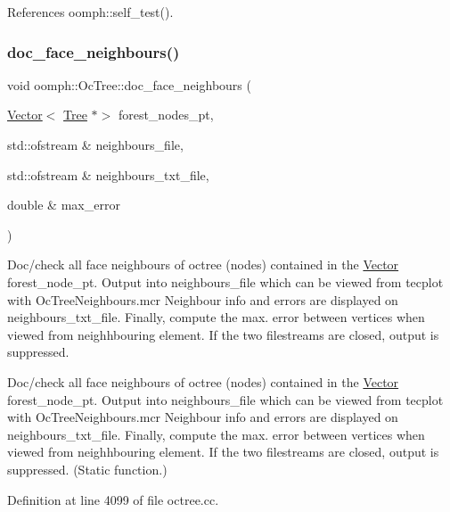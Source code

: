 References oomph\+::self\+\_\+test().

\mbox{\label{classoomph_1_1OcTree_a559d4608359c24b0cd08a25e6990f5a1}} 
\subsubsection{\texorpdfstring{doc\+\_\+face\+\_\+neighbours()}{doc\_face\_neighbours()}}
{\footnotesize\ttfamily void oomph\+::\+Oc\+Tree\+::doc\+\_\+face\+\_\+neighbours (\begin{DoxyParamCaption}\item[{\hyperlink{classoomph_1_1Vector}{Vector}$<$ \hyperlink{classoomph_1_1Tree}{Tree} $\ast$$>$}]{forest\+\_\+nodes\+\_\+pt,  }\item[{std\+::ofstream \&}]{neighbours\+\_\+file,  }\item[{std\+::ofstream \&}]{neighbours\+\_\+txt\+\_\+file,  }\item[{double \&}]{max\+\_\+error }\end{DoxyParamCaption})\hspace{0.3cm}{\ttfamily [static]}}



Doc/check all face neighbours of octree (nodes) contained in the \hyperlink{classoomph_1_1Vector}{Vector} forest\+\_\+node\+\_\+pt. Output into neighbours\+\_\+file which can be viewed from tecplot with Oc\+Tree\+Neighbours.\+mcr Neighbour info and errors are displayed on neighbours\+\_\+txt\+\_\+file. Finally, compute the max. error between vertices when viewed from neighhbouring element. If the two filestreams are closed, output is suppressed. 

Doc/check all face neighbours of octree (nodes) contained in the \hyperlink{classoomph_1_1Vector}{Vector} forest\+\_\+node\+\_\+pt. Output into neighbours\+\_\+file which can be viewed from tecplot with Oc\+Tree\+Neighbours.\+mcr Neighbour info and errors are displayed on neighbours\+\_\+txt\+\_\+file. Finally, compute the max. error between vertices when viewed from neighhbouring element. If the two filestreams are closed, output is suppressed. (Static function.) 

Definition at line 4099 of file octree.\+cc.



